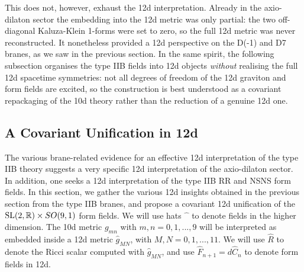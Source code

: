 This does not, however, exhaust the 12d interpretation.
Already in the axio-dilaton sector the embedding into the 12d metric was only partial: the two off-diagonal Kaluza-Klein 1-forms were set to zero, so the full 12d metric was never reconstructed. It nonetheless provided a 12d perspective on the D(-1) and D7 branes, as we saw in the previous section.
In the same spirit, the following subsection organises the type IIB fields into 12d objects \emph{without} realising the full 12d spacetime symmetries: not all degrees of freedom of the 12d graviton and form fields are excited, so the construction is best understood as a covariant repackaging of the 10d theory rather than the reduction of a genuine 12d one.

\subsection{A Covariant Unification in 12d}
\label{sec:a-covariant-unification-in-12d}

The various brane-related evidence for an effective 12d interpretation of the type IIB theory suggests a very specific 12d interpretation of the axio-dilaton sector.
In addition, one seeks a 12d interpretation of the type IIB RR and NSNS form fields.
In this section, we gather the various 12d insights obtained in the previous section from the type IIB branes, and propose a covariant 12d unification of the $\mathrm{SL}(2,\mathbb{R}){}\times SO(9,1)$ form fields.
We will use hats $\widehat{\phantom{x}}$ to denote fields in the higher dimension.
The 10d metric $g_{mn}$ with $m,n=0,1,...,9$ will be interpreted as embedded inside a 12d metric $\widehat{g}_{MN}$, with $M,N=0,1,...,11$. We will use $\widehat R$ to denote the Ricci scalar computed with $\widehat{g}_{MN}$, and use $\widehat{F}_{n+1} = d\widehat{C}_{n}$ to denote form fields in 12d.

